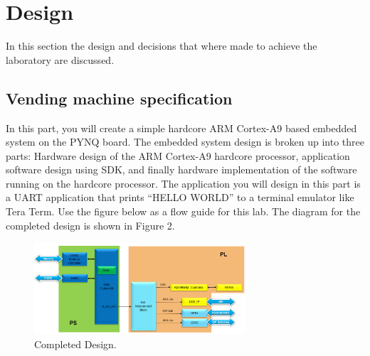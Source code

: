 \section{Design}\label{sec: Design}
In this section the design and decisions that where made to achieve the laboratory are discussed.
\subsection{Vending machine specification}\label{subsec: Vending machine specification}
In this part, you will create a simple hardcore ARM Cortex-A9 based embedded system on the PYNQ board. The
embedded system design is broken up into three parts: Hardware design of the ARM Cortex-A9 hardcore
processor, application software design using SDK, and finally hardware implementation of the software running
on the hardcore processor. The application you will design in this part is a UART application that prints “HELLO
WORLD” to a terminal emulator like Tera Term. Use the figure below as a flow guide for this lab. The diagram
for the completed design is shown in Figure 2. 
\begin{figure}[H]
	\centering
	\includegraphics[width=0.7\textwidth]{01_images/Vivado_lab4_CompletedDesign.PNG}
	\caption{Completed Design.}
	\label{fig: Vivado_lab4_CompletedDesign}
\end{figure}


